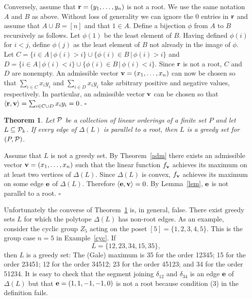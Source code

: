 \documentclass[12pt]{article}
\renewcommand{\P}{{\cal P}}
\newcommand{\proof}{\noindent{\em Proof: }}
\newcommand{\B}{\bigskip}
\newcommand{\qed}{\hspace{\fill}$\square$}
\newtheorem{theorem}[equation]{Theorem}
\begin{document}
Conversely, assume that ${\bf r} = (y_1, \dots ,y_n)$ is not a root.
We use the same notation $A$ and $B$ as above.  Without loss of
generality we can ignore the 0 entries in ${\bf r}$ and assume that $A
\cup B = [n]$ and that $1 \in A$.  Define a bijection $\phi$ from $A$
to $B$ recursively as follows.  Let $\phi(1)$ be the least element of
$B$.  Having defined $\phi(i)$ for $i < j$, define
$\phi(j)$ as the least element of $B$ not already in the image of
$\phi$.  Let $C = \{ i\in A \, | \, \phi(i) > i\} \cup \{ \phi(i) \in B \, |
\,  \phi(i) > i\}$ and $D = \{ i\in A \, | \, \phi(i) < i\}
\cup \{ \phi(i) \in B \, |  \, \phi(i) < i\}$.  Since ${\bf r}$ is
not a root, $C$ and $D$ are nonempty.  An admissible vector ${\bf v} =
(x_1, \dots ,x_n)$ can now be chosen so that $\sum_{i\in C} x_iy_i$
and $\sum_{i\in D} x_iy_i$ take arbitrary positive and negative values,
respectively.  In particular, an admissible vector ${\bf v}$ can be chosen so
that $\langle {\bf r}, {\bf v} \rangle = \sum_{i\in C\cup D} x_iy_i = 0$.
\qed \B

\begin{theorem} \label{root}  Let $\P$ be a collection of linear orderings
of a finite set $P$ and let $L \subseteq \P_k$.  If every edge of $\Delta
(L)$ is parallel to a root, then $L$ is a greedy set for $(P,\P)$.
\end{theorem}

\proof Assume that $L$ is not a greedy set.  By Theorem~\ref{adm}
there exists an admissible vector ${\bf v} = (x_1, \dots,
x_n)$ such that the linear function $f_{\bf v}$ achieves its maximum on at
least two vertices of $\Delta (L)$.  Since $\Delta (L)$ is convex,
$f_{\bf v}$ achieves its maximum on some edge ${\bf e}$ of $\Delta
(L)$.  Therefore $\langle {\bf e}, {\bf v} \rangle = 0$.  By
Lemma~\ref{lem}, ${\bf e}$ is not parallel to a root.  \qed \B

Unfortunately the converse of Theorem~\ref{root} is, in general,
false.  There exist greedy sets $L$ for which the polytope $\Delta
(L)$ has non-root edges.  As an example, consider the cyclic group
$Z_5$ acting on the poset $[5] = \{ 1,2,3,4,5\}$.  This is the group
case $n=5$ in Example~\ref{cyc}.  If
$$L = \{ 12, 23, 34, 15, 35 \},$$ then $L$ is a greedy set:  The
(Gale) maximum is 35 for the order 12345; 15 for the order 23451; 12
for the order 34512; 23 for the order 45123; and 34 for the order
51234.  It is easy to check that the segment joining $\delta_{12}$ and
$\delta_{34}$ is an edge ${\bf e}$ of $\Delta(L)$ but that ${\bf e} =
(1,1,-1,-1,0)$ is not a root because condition (3) in the definition
fails.  \B
\end{document}
